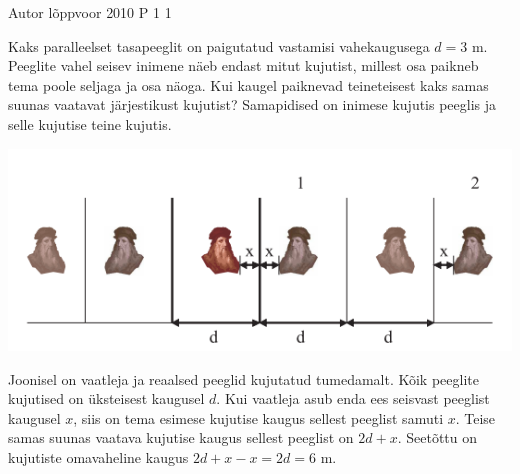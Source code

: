 {Autor} %
{lõppvoor} %
{2010} %
{P 1} %
{1} %
{
\ifStatement
Kaks paralleelset tasapeeglit on paigutatud vastamisi vahekaugusega $d = 3$ m. Peeglite vahel seisev inimene näeb endast mitut kujutist, millest osa paikneb tema poole seljaga ja osa näoga. Kui kaugel paiknevad teineteisest kaks samas suunas vaatavat järjestikust kujutist?
\fi
\ifHint
Samapidised on inimese kujutis peeglis ja selle kujutise teine kujutis.
\fi
\ifSolution
\begin{center}
	\includegraphics[width=0.5\linewidth]{2010-v3p-01-lah.PNG}
\end{center}
Joonisel on vaatleja ja reaalsed peeglid kujutatud tumedamalt. Kõik peeglite kujutised on üksteisest kaugusel $d$. Kui vaatleja asub enda ees seisvast peeglist kaugusel $x$, siis on tema esimese kujutise kaugus sellest peeglist samuti $x$. Teise samas suunas vaatava kujutise kaugus sellest peeglist on $2d + x$. Seetõttu on kujutiste omavaheline kaugus $2d + x - x = 2d = 6$ m.
\fi
}
